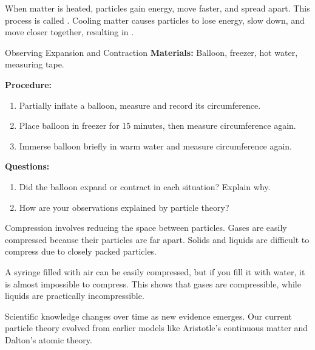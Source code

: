 \FloatBarrier
\1

When matter is heated, particles gain energy, move faster, and spread apart. This process is called . Cooling matter causes particles to lose energy, slow down, and move closer together, resulting in .

\begin{investigation}{Observing Expansion and Contraction}
\textbf{Materials:} Balloon, freezer, hot water, measuring tape.

\textbf{Procedure:}
\begin{enumerate}
    \item Partially inflate a balloon, measure and record its circumference.
    \item Place balloon in freezer for 15 minutes, then measure circumference again.
    \item Immerse balloon briefly in warm water and measure circumference again.
\end{enumerate}

\textbf{Questions:}
\begin{enumerate}
    \item Did the balloon expand or contract in each situation? Explain why.
    \item How are your observations explained by particle theory?
\end{enumerate}
\end{investigation}

\FloatBarrier
\1

Compression involves reducing the space between particles. Gases are easily compressed because their particles are far apart. Solids and liquids are difficult to compress due to closely packed particles.

\begin{example}
A syringe filled with air can be easily compressed, but if you fill it with water, it is almost impossible to compress. This shows that gases are compressible, while liquids are practically incompressible.
\end{example}

\FloatBarrier
\1

Scientific knowledge changes over time as new evidence emerges. Our current particle theory evolved from earlier models like Aristotle’s continuous matter and Dalton’s atomic theory.


